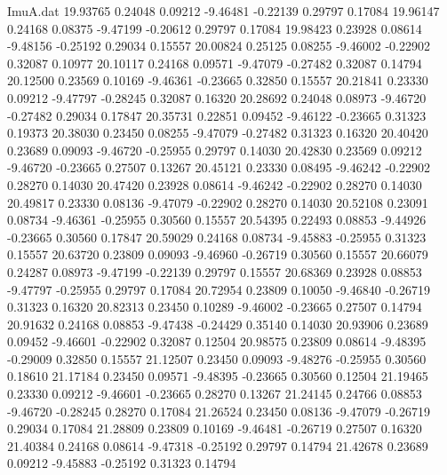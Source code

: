 \begin{filecontents}{ImuA.dat}
  19.93765    0.24048    0.09212   -9.46481   -0.22139    0.29797    0.17084
  19.96147    0.24168    0.08375   -9.47199   -0.20612    0.29797    0.17084
  19.98423    0.23928    0.08614   -9.48156   -0.25192    0.29034    0.15557
  20.00824    0.25125    0.08255   -9.46002   -0.22902    0.32087    0.10977
  20.10117    0.24168    0.09571   -9.47079   -0.27482    0.32087    0.14794
  20.12500    0.23569    0.10169   -9.46361   -0.23665    0.32850    0.15557
  20.21841    0.23330    0.09212   -9.47797   -0.28245    0.32087    0.16320
  20.28692    0.24048    0.08973   -9.46720   -0.27482    0.29034    0.17847
  20.35731    0.22851    0.09452   -9.46122   -0.23665    0.31323    0.19373
  20.38030    0.23450    0.08255   -9.47079   -0.27482    0.31323    0.16320
  20.40420    0.23689    0.09093   -9.46720   -0.25955    0.29797    0.14030
  20.42830    0.23569    0.09212   -9.46720   -0.23665    0.27507    0.13267
  20.45121    0.23330    0.08495   -9.46242   -0.22902    0.28270    0.14030
  20.47420    0.23928    0.08614   -9.46242   -0.22902    0.28270    0.14030
  20.49817    0.23330    0.08136   -9.47079   -0.22902    0.28270    0.14030
  20.52108    0.23091    0.08734   -9.46361   -0.25955    0.30560    0.15557
  20.54395    0.22493    0.08853   -9.44926   -0.23665    0.30560    0.17847
  20.59029    0.24168    0.08734   -9.45883   -0.25955    0.31323    0.15557
  20.63720    0.23809    0.09093   -9.46960   -0.26719    0.30560    0.15557
  20.66079    0.24287    0.08973   -9.47199   -0.22139    0.29797    0.15557
  20.68369    0.23928    0.08853   -9.47797   -0.25955    0.29797    0.17084
  20.72954    0.23809    0.10050   -9.46840   -0.26719    0.31323    0.16320
  20.82313    0.23450    0.10289   -9.46002   -0.23665    0.27507    0.14794
  20.91632    0.24168    0.08853   -9.47438   -0.24429    0.35140    0.14030
  20.93906    0.23689    0.09452   -9.46601   -0.22902    0.32087    0.12504
  20.98575    0.23809    0.08614   -9.48395   -0.29009    0.32850    0.15557
  21.12507    0.23450    0.09093   -9.48276   -0.25955    0.30560    0.18610
  21.17184    0.23450    0.09571   -9.48395   -0.23665    0.30560    0.12504
  21.19465    0.23330    0.09212   -9.46601   -0.23665    0.28270    0.13267
  21.24145    0.24766    0.08853   -9.46720   -0.28245    0.28270    0.17084
  21.26524    0.23450    0.08136   -9.47079   -0.26719    0.29034    0.17084
  21.28809    0.23809    0.10169   -9.46481   -0.26719    0.27507    0.16320
  21.40384    0.24168    0.08614   -9.47318   -0.25192    0.29797    0.14794
  21.42678    0.23689    0.09212   -9.45883   -0.25192    0.31323    0.14794

\end{filecontents}
